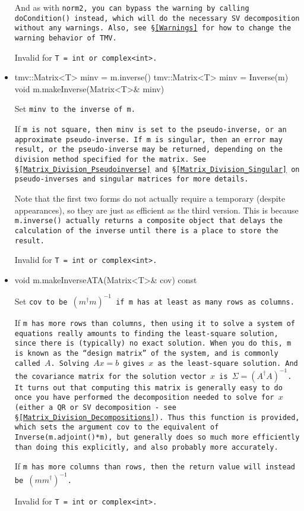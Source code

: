 \begin{itemize}
And as with \tt{norm2}, you can bypass the warning by calling \tt{doCondition()} instead,
which will do the necessary SV decomposition without any warnings.  
Also, see \S\ref{Warnings} for how to change the warning behavior of TMV.

Invalid for \tt{T = int} or \tt{complex<int>}.

\item
\begin{tmvcode}
tmv::Matrix<T> minv = m.inverse()
tmv::Matrix<T> minv = Inverse(m)
void m.makeInverse(Matrix<T>& minv)
\end{tmvcode}
Set \tt{minv} to the inverse of \tt{m}.    

If \tt{m} is not square, then \tt{minv} is set to the pseudo-inverse, or an approximate
pseudo-inverse.  If \tt{m} is singular, then an error may result, or the pseudo-inverse
may be returned, depending on the division method specified for the matrix.  
See \S\ref{Matrix_Division_Pseudoinverse} and \S\ref{Matrix_Division_Singular} 
on pseudo-inverses and singular matrices for more details.

Note that the first two forms do not actually require a 
temporary (despite appearances), so they are just as efficient as the third version.
This is because \tt{m.inverse()} actually returns a composite object
that delays the calculation of the inverse
until there is a place to store the result.

Invalid for \tt{T = int} or \tt{complex<int>}.

\item
\begin{tmvcode}
void m.makeInverseATA(Matrix<T>& cov) const
\end{tmvcode}
Set \tt{cov} to be $(m^\dagger m)^{-1}$ if \tt{m} has at least as many rows as columns.

If \tt{m} has more rows than columns, then using it to solve a system of equations
really amounts to finding the least-square solution, since there is (typically) no
exact solution.  When you do this, \tt{m} is known as the ``design matrix'' of the system,
and is commonly called $A$.  Solving $A x=b$ gives $x$ as the least-square 
solution.  And the covariance matrix for the solution vector $x$ is 
$\Sigma = (A^\dagger A)^{-1}$.
It turns out that computing this matrix is generally easy to do once you have 
performed the decomposition needed to solve for $x$ (either a QR or SV 
decomposition - see \S\ref{Matrix_Division_Decompositions}).  
Thus this function is provided, which sets the
argument \tt{cov} to the equivalent of \tt{Inverse(m.adjoint()*m)}, 
but generally does so much more efficiently than doing this explicitly, 
and also probably more accurately.

If \tt{m} has more columns than rows, then the return value will instead be
$(m m^\dagger)^{-1}$.  

Invalid for \tt{T = int} or \tt{complex<int>}.

\end{itemize}


